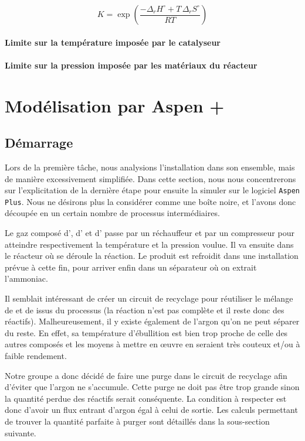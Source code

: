 \documentclass[a4paper, oneside, 12pt]{article}
\begin{document}
\[
K = \exp{\left( \frac{- \Delta_r H^{\circ} + T \, \Delta_r S^{\circ}}{R T}\right)}
\]

\paragraph{Limite sur la température imposée par le catalyseur}

\paragraph{Limite sur la pression imposée par les matériaux du réacteur}

\section{Modélisation par Aspen +}
\subsection{Démarrage}

Lors de la première tâche, nous analysions l'installation dans son ensemble, 
mais de manière excessivement simplifiée. 
Dans cette section, nous nous concentrerons sur l'explicitation de la dernière étape 
pour ensuite la simuler sur le logiciel \texttt{Aspen Plus}. 
Nous ne désirons plus la considérer comme une boîte noire, et l'avons donc découpée 
en un certain nombre de processus intermédiaires. 

Le gaz composé d', d' et d' passe par un réchauffeur et par un compresseur 
pour atteindre respectivement la température et la pression voulue. 
Il va ensuite dans le réacteur où se déroule la réaction.
Le produit est refroidit dans une installation prévue à cette fin, 
pour arriver enfin dans un séparateur où on extrait l'ammoniac.

Il semblait intéressant de créer un circuit de recyclage pour réutiliser 
le mélange de  et de  issus du processus (la réaction n'est pas complète 
et il reste donc des réactifs). Malheureusement, il y existe également de l'argon 
qu'on ne peut séparer du reste. En effet, sa température d'ébullition est bien trop 
proche de celle des autres composés et les moyens à mettre en œuvre en seraient 
très couteux et/ou à faible rendement.

Notre groupe a donc décidé de faire une purge dans le circuit de recyclage afin d'éviter que l'argon ne s'accumule. Cette purge ne doit pas être trop grande sinon la quantité perdue des réactifs serait conséquente. 
La condition à respecter est donc d'avoir un flux entrant d'argon égal à celui de sortie. 
Les calculs permettant de trouver la quantité parfaite à purger 
sont détaillés dans la sous-section suivante.
\end{document}
